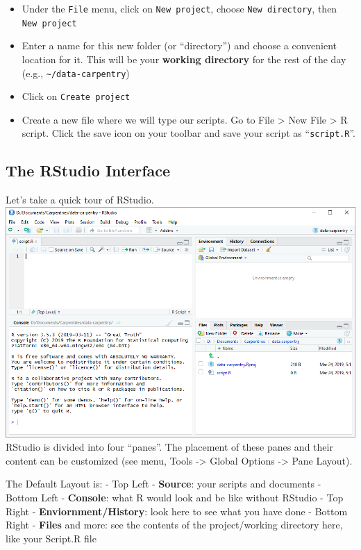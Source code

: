 \documentclass[]{book}
\providecommand{\tightlist}{%
  \setlength{\itemsep}{0pt}\setlength{\parskip}{0pt}}
\begin{document}
\begin{itemize}
\tightlist
\item
  Under the \texttt{File} menu, click on \texttt{New\ project}, choose
  \texttt{New\ directory}, then \texttt{New\ project}
\item
  Enter a name for this new folder (or ``directory'') and choose a
  convenient location for it. This will be your \textbf{working
  directory} for the rest of the day (e.g.,
  \texttt{\textasciitilde{}/data-carpentry})
\item
  Click on \texttt{Create\ project}
\item
  Create a new file where we will type our scripts. Go to File
  \textgreater{} New File \textgreater{} R script. Click the save icon
  on your toolbar and save your script as ``\texttt{script.R}''.
\end{itemize}

\subsection{The RStudio Interface}\label{the-rstudio-interface}

Let's take a quick tour of RStudio.
\includegraphics{./fig/R_00_Rstudio_01.png} RStudio is divided into four
``panes''. The placement of these panes and their content can be
customized (see menu, Tools -\textgreater{} Global Options
-\textgreater{} Pane Layout).

The Default Layout is: - Top Left - \textbf{Source}: your scripts and
documents - Bottom Left - \textbf{Console}: what R would look and be
like without RStudio - Top Right - \textbf{Enviornment/History}: look
here to see what you have done - Bottom Right - \textbf{Files} and more:
see the contents of the project/working directory here, like your
Script.R file
\end{document}
